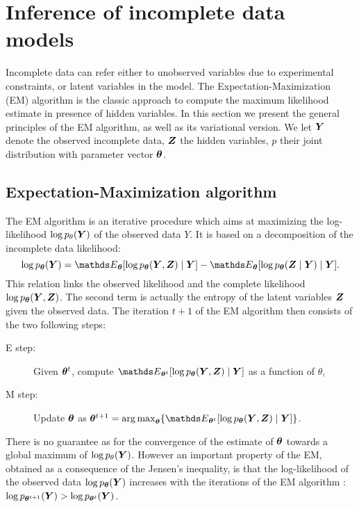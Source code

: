 \section{Inference of incomplete data models}
Incomplete data can refer either to unobserved variables due to experimental constraints, or latent variables in the model. The Expectation-Maximization (EM) algorithm \citep{DLR77} is the classic approach to compute the maximum likelihood estimate in presence of hidden variables. In this section we present the general principles of the EM algorithm, as well as its variational version. We let ${\boldsymbol{Y}}$ denote the observed incomplete data, ${\boldsymbol{Z}}$ the hidden variables, $p$ their joint distribution with parameter vector ${\boldsymbol{\theta}}$.
 
 \subsection{Expectation-Maximization algorithm}
 The EM algorithm is an iterative procedure which aims at maximizing the log-likelihood $\log p_\theta({\boldsymbol{Y}})$ of the observed data $Y$. It is based on a decomposition of the incomplete data likelihood:
 $$\log p_{\thetab} (\Ybf) = \Esp_\thetab [\log p_{\thetab} (\Ybf,\Zbf)\mid\Ybf] - \Esp_\thetab [\log p_{\thetab} (\Zbf\mid\Ybf) \mid \Ybf]. $$
This relation links the observed likelihood and the complete likelihood $\log p_{{\boldsymbol{\theta}}} ({\boldsymbol{Y}},{\boldsymbol{Z}})$. The second term is actually the entropy of the latent variables ${\boldsymbol{Z}}$ given the observed data.
The iteration $t+1$ of the EM algorithm then consists of the two following steps:
 \begin{description}
 \item [E step:] Given ${\boldsymbol{\theta}}^t$, compute $\Esp_{\thetab^t}[\log p_\thetab (\Ybf, \Zbf)\mid \Ybf]$ as a function of $\theta$,
 \item [M step:] Update ${\boldsymbol{\theta}}$ as $\thetab^{t+1} = \argmax_\thetab \{ \Esp_{\thetab^t}[\log p_\thetab (\Ybf, \Zbf)\mid \Ybf]\}$.
 \end{description} 
There is no guarantee as for the convergence of the estimate of ${\boldsymbol{\theta}}$ towards a global maximum of $\log p_\theta({\boldsymbol{Y}})$. However an important property of the EM, obtained as a consequence of the Jensen's inequality,  is that the log-likelihood of the observed data $\log p_{{\boldsymbol{\theta}}} ({\boldsymbol{Y}})$ increases with the iterations of the EM algorithm \citep{DLR77}: $\log p_{{\boldsymbol{\theta}}^{t+1}} ({\boldsymbol{Y}}) > \log p_{{\boldsymbol{\theta}}^t} ({\boldsymbol{Y}})$.\\
 
